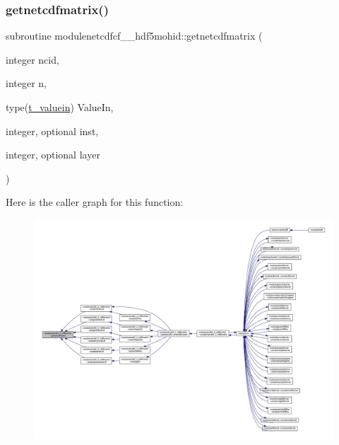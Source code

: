 \subsubsection{\texorpdfstring{getnetcdfmatrix()}{getnetcdfmatrix()}}
{\footnotesize\ttfamily subroutine modulenetcdfcf\+\_\+\_\+hdf5mohid\+::getnetcdfmatrix (\begin{DoxyParamCaption}\item[{integer}]{ncid,  }\item[{integer}]{n,  }\item[{type(\mbox{\hyperlink{structmodulenetcdfcf__2__hdf5mohid_1_1t__valuein}{t\+\_\+valuein}})}]{Value\+In,  }\item[{integer, optional}]{inst,  }\item[{integer, optional}]{layer }\end{DoxyParamCaption})\hspace{0.3cm}{\ttfamily [private]}}

Here is the caller graph for this function\+:\nopagebreak
\begin{figure}[H]
\begin{center}
\leavevmode
\includegraphics[width=350pt]{namespacemodulenetcdfcf__2__hdf5mohid_a788802bec9e3806cfd877eb5bf6d2fef_icgraph}
\end{center}
\end{figure}
\mbox{\label{namespacemodulenetcdfcf__2__hdf5mohid_a8bdc7928ff8c39c76b2c5fda4b90f2c5}} 

